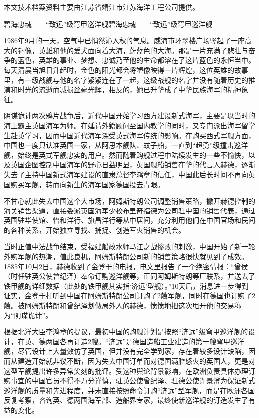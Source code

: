 \documentclass[12pt,UTF8]{ctexbook}
\begin{document}
本文技术档案资料主要由江苏省靖江市江苏海洋工程公司提供。

碧海忠魂——“致远”级穹甲巡洋舰碧海忠魂——“致远”级穹甲巡洋舰

1986年9月的一天，空气中已悄然沁入秋的气息。威海市环翠楼广场竖起了一座高大的铜像，英雄和他的爱犬面向着大海，蔚蓝色的大海。那是一片充满了悲壮与奋争的蓝色，英雄的事业、梦想、忠诚乃至他的生命都溶在了这片蓝色的永恒当中。每天清晨当旭日升起时，金色的阳光都会将塑像映得一片辉煌，这位英雄的故事里，有一级战舰与他的名字紧紧连在了一起，这级战舰的名字并没有随着历史的推演和时光的流逝而减损丝毫光辉，相反的，她已升华成了中华民族海军的精神象征。

阴谋诡计两次鸦片战争后，近代中国开始学习西方建设新式海军，主要是以当时的海上霸主英国海军为师。在延请外籍顾问至国内教学的同时，又专门派出海军留学生赴英学习，因而中国近代海军深受英式海军传统的影响。在购买西式军舰方面，中国也一度只认准英国一家，从阿思本舰队、蚊子船，一直到“超勇”级撞击巡洋舰，始终是英式军舰忠实的用户。然而随着购舰过程中陆续发生的一些不愉快，以及英国企图控制中国海军的野心日益明显，英国舰船销售在华的代言人赫德，逐渐失去了主持中国新式海军建设的直隶总督李鸿章的信任，中国此后长时间不再向英国购买军舰，转而向新生的海军国家德国投去青眼。

不甘心就此失去中国这个大市场，阿姆斯特朗公司调整销售策略，撇开赫德控制的海关销售渠道，直接委派英国海军少校布里奇福德为公司驻中国的销售代表，通过英国驻华使馆、怡和洋行、旗昌洋行等从中居间，充分利用他们在中国官场和民间的各种关系，开始独立寻找、捕捉、创造军火销售的机会。

当时正值中法战争结束，受福建船政水师马江之战惨败的刺激，中国开始了新一轮外购军舰的热潮，值此良机，阿姆斯特朗公司新的销售策略很快就见到了成效。1885年10月2日，赫德收到了金登干的电报，电文里报告了一个绝密情报：“曾侯（时任驻英公使曾纪泽）奉命订购巡洋舰等，正同阿姆斯特朗等厂联系，并送去了铁甲舰的详细数据（此处的铁甲舰其实指‘济远’型舰）。”10天后，消息进一步得到证实，金登干打听到中国在阿姆斯特朗公司订购了2艘军舰，同时在德国也订购了2艘。被阿姆斯特朗和曾纪泽划做局外人的赫德，愤愤地把这次甩开他的交易称为“阴谋诡计”。

根据北洋大臣李鸿章的提议，最初中国的购舰计划是按照“济远”级穹甲巡洋舰的设计，在英、德两国各再订造2艘。“济远”是德国造船工业建造的第一艘穹甲巡洋舰，尽管设计上大量效仿了英国，但并没有完全学到家，存在着较多设计缺陷，因而从建造开始就非议不断，因为失去中国订单而对德国满腔怒火的英国人，更是对这型军舰提出许多异常尖刻的批评。受这种舆论背景影响，在欧洲负责具体办理订购事宜的中国官员不得不万分谨慎，驻英公使曾纪泽、驻德公使许景澄为保证新式巡洋舰的质量和先进程度，并未直接按照命令订购“济远”型军舰，而是在欧洲各国反复考察，咨询英、德两国海军部、造船界专家，最终使新巡洋舰的订造发生了有益的变化。
\end{document}

